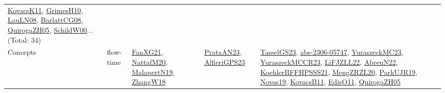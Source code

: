 {\begin{longtable}{lp{3cm}>{\raggedright}p{6cm}>{\raggedright}p{6cm}p{8cm}}
\href{articles/KovacsK11.pdf}{KovacsK11}\cite{KovacsK11}, \href{papers/GrimesH10.pdf}{GrimesH10}\cite{GrimesH10}, \href{papers/LauLN08.pdf}{LauLN08}\cite{LauLN08}, \href{papers/BarlattCG08.pdf}{BarlattCG08}\cite{BarlattCG08}, \href{papers/QuirogaZH05.pdf}{QuirogaZH05}\cite{QuirogaZH05}, \href{articles/SchildW00.pdf}{SchildW00}\cite{SchildW00}... (Total: 34)\\
Concepts & flow-time & \href{articles/FanXG21.pdf}{FanXG21}\cite{FanXG21}, \href{papers/NattafM20.pdf}{NattafM20}\cite{NattafM20}, \href{papers/MalapertN19.pdf}{MalapertN19}\cite{MalapertN19}, \href{articles/ZhangW18.pdf}{ZhangW18}\cite{ZhangW18} & \href{articles/PrataAN23.pdf}{PrataAN23}\cite{PrataAN23}, \href{articles/AlfieriGPS23.pdf}{AlfieriGPS23}\cite{AlfieriGPS23} & \href{papers/TasselGS23.pdf}{TasselGS23}\cite{TasselGS23}, \href{articles/abs-2306-05747.pdf}{abs-2306-05747}\cite{abs-2306-05747}, \href{papers/YuraszeckMC23.pdf}{YuraszeckMC23}\cite{YuraszeckMC23}, \href{articles/YuraszeckMCCR23.pdf}{YuraszeckMCCR23}\cite{YuraszeckMCCR23}, \href{papers/LiFJZLL22.pdf}{LiFJZLL22}\cite{LiFJZLL22}, \href{articles/AbreuN22.pdf}{AbreuN22}\cite{AbreuN22}, \href{articles/KoehlerBFFHPSSS21.pdf}{KoehlerBFFHPSSS21}\cite{KoehlerBFFHPSSS21}, \href{articles/MengZRZL20.pdf}{MengZRZL20}\cite{MengZRZL20}, \href{papers/ParkUJR19.pdf}{ParkUJR19}\cite{ParkUJR19}, \href{articles/Novas19.pdf}{Novas19}\cite{Novas19}, \href{articles/KovacsB11.pdf}{KovacsB11}\cite{KovacsB11}, \href{papers/EdisO11.pdf}{EdisO11}\cite{EdisO11}, \href{papers/QuirogaZH05.pdf}{QuirogaZH05}\cite{QuirogaZH05}\\

\end{longtable}}
